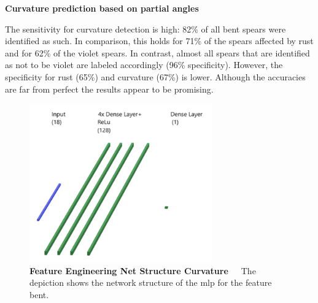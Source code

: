 \bigskip
\textbf{Curvature prediction based on partial angles} 

The sensitivity for curvature detection is high: 82\% of all bent spears were identified as such. In comparison, this holds for 71\% of the spears affected by rust and for 62\% of the violet spears. In contrast, almost all spears that are identified as not to be violet are labeled accordingly (96\% specificity). However, the specificity for rust (65\%) and curvature (67\%) is lower. Although the accuracies are far from perfect the results appear to be promising.

\begin{figure}[!htb]
	\centering
	\includegraphics[width=0.70\textwidth]{Figures/chapter04/fe_curvature.png}
	\decoRule
	\caption[Feature Engineering Net Structure Curvature]{\textbf{Feature Engineering Net Structure Curvature}~~~The depiction shows the network structure of the \acrshort{mlp} for the feature bent.}
	\label{fig:FeatureEngineeringNetStructureCurve}
\end{figure}

\begin{table}[!h]
	\centering
	\caption[Feature Engineering Curvature Prediction]{\textbf{Curvature Prediction}~~~Performance of curvature prediction based on angles.}
	\label{tab:performance_angle_based}
\end{table}

